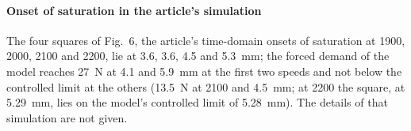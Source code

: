 \paragraph{Onset of saturation in the article's simulation} The four squares of Fig.~6, the article's time-domain onsets of saturation at 1900, 2000, 2100 and \SI{2200}{\rpm}, lie at 3.6, 3.6, 4.5 and \SI{5.3}{\milli\metre}; the forced demand of the model reaches \SI{27}{\newton} at 4.1 and \SI{5.9}{\milli\metre} at the first two speeds and not below the controlled limit at the others (\SI{13.5}{\newton} at \SI{2100}{\rpm} and \SI{4.5}{\milli\metre}; at \SI{2200}{\rpm} the square, at \SI{5.29}{\milli\metre}, lies on the model's controlled limit of \SI{5.28}{\milli\metre}). The details of that simulation are not given.

